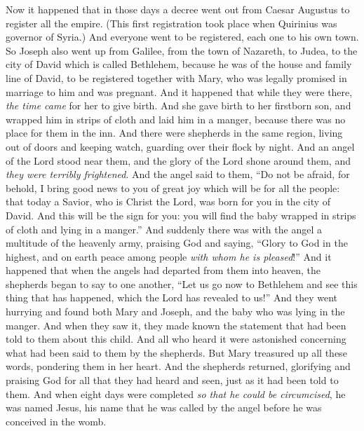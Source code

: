 \begin{biblechapter} %
 Now it happened that in those days a decree went out from Caesar Augustus to register all the empire.
\verse (This first registration took place when Quirinius was governor of Syria.)
\verse And everyone went to be registered, each one to his own town.
\verse So Joseph also went up from Galilee, from the town of Nazareth, to Judea, to the city of David which is called Bethlehem, because he was of the house and family line of David,
\verse to be registered together with Mary, who was legally promised in marriage to him and was pregnant.
\verse And it happened that while they were there, \textit{the time came} for her to give birth.
\verse And she gave birth to her firstborn son, and wrapped him in strips of cloth and laid him in a manger, because there was no place for them in the inn.
 And there were shepherds in the same region, living out of doors and keeping watch, guarding over their flock by night.
\verse And an angel of the Lord stood near them, and the glory of the Lord shone around them, and \textit{they were terribly frightened}.
\verse And the angel said to them, “Do not be afraid, for behold, I bring good news to you of great joy which will be for all the people:
\verse that today a Savior, who is Christ the Lord, was born for you in the city of David.
\verse And this will be the sign for you: you will find the baby wrapped in strips of cloth and lying in a manger.”
\verse And suddenly there was with the angel a multitude of the heavenly army, praising God and saying,
\verse “Glory to God in the highest, 
and on earth peace 
among people \textit{with whom he is pleased}!”
\verse And it happened that when the angels had departed from them into heaven, the shepherds began to say to one another, “Let us go now to Bethlehem and see this thing that has happened, which the Lord has revealed to us!”
\verse And they went hurrying and found both Mary and Joseph, and the baby who was lying in the manger.
\verse And when they saw it, they made known the statement that had been told to them about this child.
\verse And all who heard it were astonished concerning what had been said to them by the shepherds.
\verse But Mary treasured up all these words, pondering them in her heart.
\verse And the shepherds returned, glorifying and praising God for all that they had heard and seen, just as it had been told to them.
\verse And when eight days were completed \textit{so that he could be circumcised}, he was named Jesus, his name that he was called by the angel before he was conceived in the womb.

\end{biblechapter}
